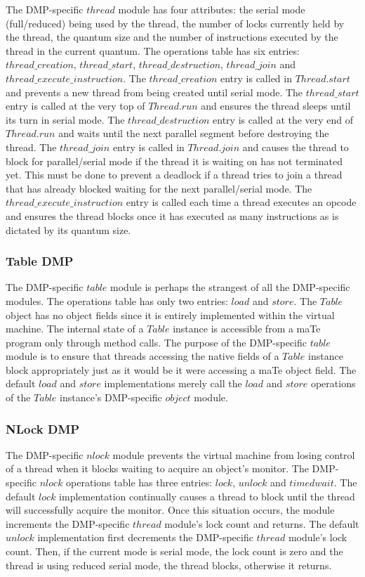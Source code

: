 The DMP-specific $thread$ module has four attributes: the serial mode
(full/reduced) being used by the thread, the number of locks currently
held by the thread, the quantum size and the number of instructions
executed by the thread in the current quantum.  The operations table
has six entries: $thread\_creation$, $thread\_start$,
$thread\_destruction$, $thread\_join$ and
$thread\_execute\_instruction$.  The $thread\_creation$ entry is
called in $Thread.start$ and prevents a new thread from being created
until serial mode.  The $thread\_start$ entry is called at the very
top of $Thread.run$ and ensures the thread sleeps until its turn in
serial mode.  The $thread\_destruction$ entry is called at the very
end of $Thread.run$ and waits until the next parallel segment before
destroying the thread.  The $thread\_join$ entry is called in
$Thread.join$ and causes the thread to block for parallel/serial mode
if the thread it is waiting on has not terminated yet.  This must be
done to prevent a deadlock if a thread tries to join a thread that has
already blocked waiting for the next parallel/serial mode.  The
$thread\_execute\_instruction$ entry is called each time a thread
executes an opcode and ensures the thread blocks once it has executed
as many instructions as is dictated by its quantum size.

\subsubsection{Table DMP}

The DMP-specific $table$ module is perhaps the strangest of all the
DMP-specific modules.  The operations table has only two entries:
$load$ and $store$.  The $Table$ object has no object fields since it
is entirely implemented within the virtual machine.  The internal
state of a $Table$ instance is accessible from a maTe program only
through method calls.  The purpose of the DMP-specific $table$ module
is to ensure that threads accessing the native fields of a $Table$
instance block appropriately just as it would be it were accessing a
maTe object field.  The default $load$ and $store$ implementations
merely call the $load$ and $store$ operations of the $Table$
instance's DMP-specific $object$ module.

\subsubsection{NLock DMP}

The DMP-specific $nlock$ module prevents the virtual machine from
losing control of a thread when it blocks waiting to acquire an
object's monitor.  The DMP-specific $nlock$ operations table has three
entries: $lock$, $unlock$ and $timedwait$.  The default $lock$
implementation continually causes a thread to block until the thread
will successfully acquire the monitor.  Once this situation occurs,
the module increments the DMP-specific $thread$ module's lock count
and returns.  The default $unlock$ implementation first decrements the
DMP-specific $thread$ module's lock count. Then, if the current mode
is serial mode, the lock count is zero and the thread is using reduced
serial mode, the thread blocks, otherwise it returns.

